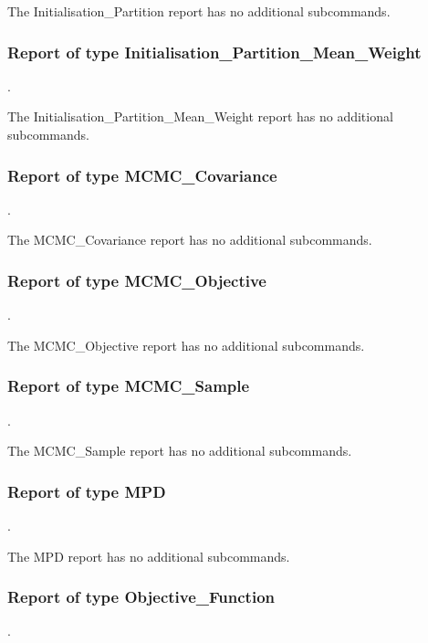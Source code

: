 The Initialisation\_Partition report has no additional subcommands.

\subsubsection{Report of type Initialisation\_Partition\_Mean\_Weight}
.
\label{syntax:Report-InitialisationPartitionMeanWeight}

The Initialisation\_Partition\_Mean\_Weight report has no additional subcommands.

\subsubsection{Report of type MCMC\_Covariance}
.
\label{syntax:Report-MCMCCovariance}

The MCMC\_Covariance report has no additional subcommands.

\subsubsection{Report of type MCMC\_Objective}
.
\label{syntax:Report-MCMCObjective}

The MCMC\_Objective report has no additional subcommands.

\subsubsection{Report of type MCMC\_Sample}
.
\label{syntax:Report-MCMCSample}

The MCMC\_Sample report has no additional subcommands.

\subsubsection{Report of type MPD}
.
\label{syntax:Report-MPD}

The MPD report has no additional subcommands.

\subsubsection{Report of type Objective\_Function}
.
\label{syntax:Report-ObjectiveFunction}

